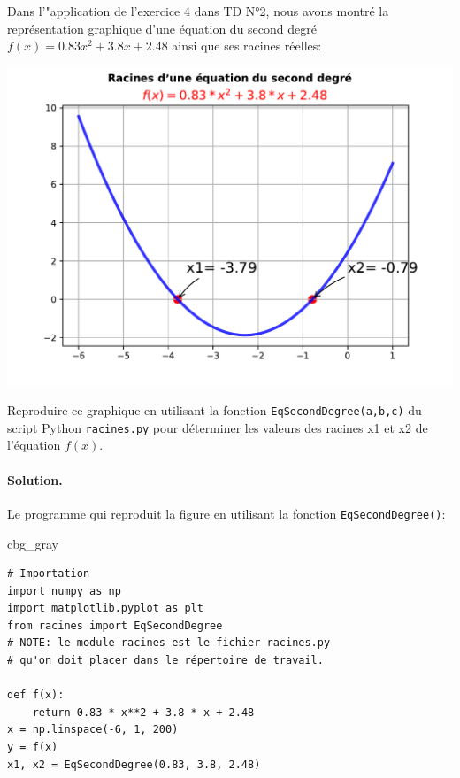 \documentclass[%
oneside,                 %
final,                   %
10pt,french]{article}
\newenvironment{_cod_tight}[1]{
   \def\FrameCommand{\colorbox{#1}}
   \FrameRule0.6pt\MakeFramed {\FrameRestore}\vskip3mm}
   {\vskip0mm\endMakeFramed}
\newenvironment{cod}[1]{
\bgroup\rmfamily
\fboxsep=0mm\relax
\begin{_cod_tight}{#1}
\list{}{\parsep=-2mm\parskip=0mm\topsep=0pt\leftmargin=2mm
\rightmargin=2\leftmargin\leftmargin=4pt\relax}
\item\relax}
{\endlist\end{_cod_tight}\egroup}
\newenvironment{doconceexercise}{}{}
\newcounter{doconceexercisecounter}
\begin{document}
\begin{doconceexercise}



Dans l'"application de l'exercice 4 dans TD N°2, nous avons montré la représentation graphique d'une équation du second degré $f(x)=0.83x^2+3.8x+2.48$ ainsi que ses racines réelles:



\vspace{6mm}

\centerline{\includegraphics[width=0.7\linewidth]{imgs/equation2deg.pdf}}

\vspace{6mm}


Reproduire ce graphique en utilisant la fonction \texttt{EqSecondDegree(a,b,c)} du script Python \texttt{racines.py} pour déterminer les valeurs des racines x1 et x2 de l’équation $f(x)$.


\paragraph{Solution.}
Le programme qui reproduit la figure en utilisant la fonction \texttt{EqSecondDegree()}:

\begin{cod}{cbg_gray}\begin{verbatim}
# Importation
import numpy as np
import matplotlib.pyplot as plt
from racines import EqSecondDegree
# NOTE: le module racines est le fichier racines.py
# qu'on doit placer dans le répertoire de travail.

def f(x):
    return 0.83 * x**2 + 3.8 * x + 2.48
x = np.linspace(-6, 1, 200)
y = f(x)
x1, x2 = EqSecondDegree(0.83, 3.8, 2.48)


\end{verbatim}
\end{cod}
\end{doconceexercise}
\end{document}
